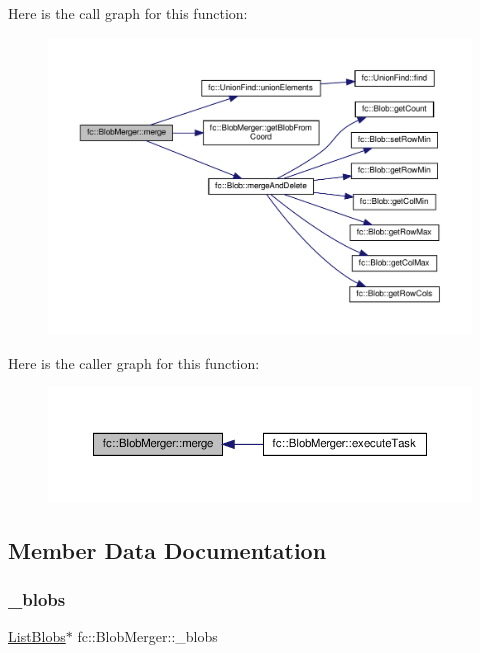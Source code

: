 Here is the call graph for this function\+:
\nopagebreak
\begin{figure}[H]
\begin{center}
\leavevmode
\includegraphics[width=350pt]{d3/df4/classfc_1_1BlobMerger_a11fa980b355aa46271460f33a5cce0ac_cgraph}
\end{center}
\end{figure}
Here is the caller graph for this function\+:
\nopagebreak
\begin{figure}[H]
\begin{center}
\leavevmode
\includegraphics[width=350pt]{d3/df4/classfc_1_1BlobMerger_a11fa980b355aa46271460f33a5cce0ac_icgraph}
\end{center}
\end{figure}


\subsection{Member Data Documentation}
\mbox{\label{classfc_1_1BlobMerger_a2754a886c8ef78537af5bd94e564cf55}} 
\subsubsection{\texorpdfstring{\+\_\+blobs}{\_blobs}}
{\footnotesize\ttfamily \hyperlink{structfc_1_1ListBlobs}{List\+Blobs}$\ast$ fc\+::\+Blob\+Merger\+::\+\_\+blobs\hspace{0.3cm}{\ttfamily [private]}}



